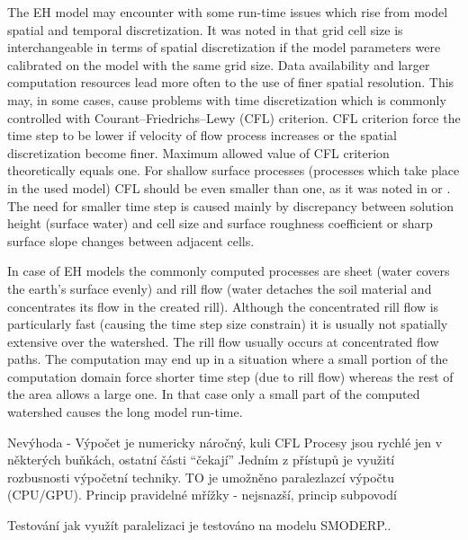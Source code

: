 The EH model may encounter with some run-time issues which 
rise from model spatial and temporal discretization. 
It was noted in \cite{molnar2000} that grid cell size is interchangeable 
in terms of spatial discretization if the model parameters 
were calibrated on the model with the same grid size. 
Data availability and larger computation resources lead more often 
to the use of finer spatial resolution. This may, in some 
cases, cause problems with time discretization which is commonly 
controlled with Courant–Friedrichs–Lewy (CFL) criterion. 
CFL criterion force the time step to be lower if velocity of flow 
process increases or the spatial discretization become finer. 
Maximum allowed value of CFL criterion theoretically equals one. 
For shallow surface processes (processes which take place in the used model) 
CFL should be even smaller than one, as it was noted in \cite{zhang1989}
or \cite{esteves2000}. The need for smaller time step 
is caused mainly by discrepancy between solution height 
(surface water) and cell size and surface roughness coefficient 
or sharp surface slope changes between adjacent cells. 

In case of EH models the commonly computed processes are sheet (water covers the earth's surface evenly) and rill flow (water detaches the soil material and concentrates its flow in the created rill). Although the concentrated rill flow is particularly fast (causing  the time step size constrain) it is usually not spatially extensive over the watershed. The rill flow usually occurs at concentrated flow paths. The computation may end up in a situation where a small portion of the computation domain force shorter time step (due to rill flow)  whereas the rest of the area allows a large one. In that case only a small part of the computed watershed causes the long model run-time. 


Nevýhoda -  Výpočet je numericky náročný, kuli CFL
Procesy jsou rychlé jen v některých buňkách, ostatní části “čekají”
Jedním z přístupů je využití rozbusnosti výpočetní techniky. 
TO je umožněno paralezlazcí výpočtu (CPU/GPU). Princip pravidelné mřížky -  nejsnazší, princip      subpovodí     

Testování jak využít paralelizaci je testováno na modelu SMODERP..
